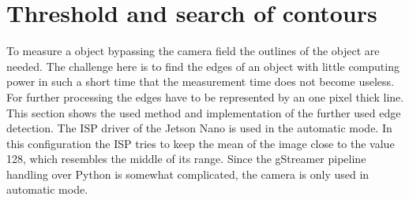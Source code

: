 \section{Threshold and search of contours}
To measure a object bypassing the camera field the outlines of the object are needed. The challenge here is to find the edges of an object with little computing power in such a short time that the measurement time does not become useless. For further processing the edges have to be represented by an one pixel thick line. This section shows the used method and implementation of the further used edge detection. The ISP driver of the Jetson Nano is used in the automatic mode. In this configuration the ISP tries to keep the mean of the image close to the value 128, which resembles the middle of its range. Since the gStreamer pipeline handling over Python is somewhat complicated, the camera is only used in automatic mode.

